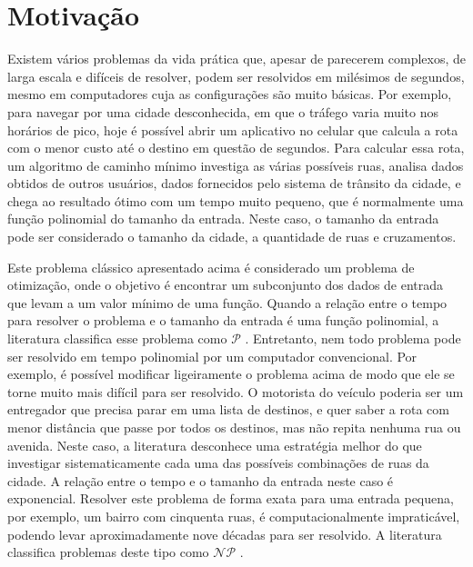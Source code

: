 \section{Motivação}

Existem vários problemas da vida prática que, apesar de parecerem complexos, de larga escala e difíceis de resolver, podem ser resolvidos em milésimos de segundos, mesmo em computadores cuja as configurações são muito básicas. Por exemplo, para navegar por uma cidade desconhecida, em que o tráfego varia muito nos horários de pico, hoje é possível abrir um aplicativo no celular que calcula a rota com o menor custo até o destino em questão de segundos. Para calcular essa rota, um algoritmo de caminho mínimo \cite{xu2007} investiga as várias possíveis ruas, analisa dados obtidos de outros usuários, dados fornecidos pelo sistema de trânsito da cidade, e chega ao resultado ótimo com um tempo muito pequeno, que é normalmente uma função polinomial do tamanho da entrada. Neste caso, o tamanho da entrada pode ser considerado o tamanho da cidade, a quantidade de ruas e cruzamentos. 

Este problema clássico apresentado acima é considerado um problema de otimização, onde o objetivo é encontrar um subconjunto dos dados de entrada que levam a um valor mínimo de uma função. Quando a relação entre o tempo para resolver o problema e o tamanho da entrada é uma função polinomial, a literatura classifica esse problema como $\mathcal{P}$ \cite{karp1972}. Entretanto, nem todo problema pode ser resolvido em tempo polinomial por um computador convencional. Por exemplo, é possível modificar ligeiramente o problema acima de modo que ele se torne muito mais difícil para ser resolvido. O motorista do veículo poderia ser um entregador que precisa parar em uma lista de destinos, e quer saber a rota com menor distância que passe por todos os destinos, mas não repita nenhuma rua ou avenida. Neste caso, a literatura desconhece uma estratégia melhor do que investigar sistematicamente cada uma das possíveis combinações de ruas da cidade. A relação entre o tempo e o tamanho da entrada neste caso é exponencial. Resolver este problema de forma exata para uma entrada pequena, por exemplo, um bairro com cinquenta ruas, é computacionalmente impraticável, podendo levar aproximadamente nove décadas para ser resolvido. A literatura classifica problemas deste tipo como $\mathcal{NP}$ \cite{li2015}.


